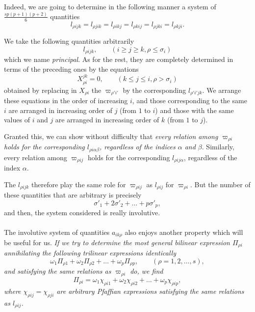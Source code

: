 \documentclass[leqno,11pt]{book}
\theoremstyle{shape1}
\theoremstyle{shapesmall}
\newcommand{\vp}{\varpi}
\begin{document}
Indeed, we are going to determine in the following manner a system of $\frac{sp(p+1)(p+2)}{6}$ quantities
\[
l_{\rho ijk}=l_{\rho jik}=l_{\rho ikj}=l_{\rho kij}=l_{\rho jki}=l_{\rho kji}.
\]

We take the following quantities arbitrarily
\[
l_{\rho ijk},\qquad(i\ge j\ge k,\rho\le \sigma_{i})
\]
which we name \emph{principal}. As for the rest, they are completely determined in terms of the preceding ones by the equations
\[
X_{\rho i}^{jk}=0,\qquad(k\le j\le i,\rho>\sigma_{i})
\]
obtained by replacing in $X_{\rho i}$ the $\vp_{\rho'i'}$ by the corresponding $l_{\rho'i'jk}$. We arrange these equations in the order of increasing $i$, and those corresponding to the same $i$ are arranged in increasing order of $j$ (from $1$ to $i$) and those with the same values of $i$ and $j$ are arranged in increasing order of $k$ (from $1$ to $j$).

Granted this, we can show without difficulty that \emph{every relation among $\vp_{\rho i}$ holds for the corresponding $l_{\rho i\alpha\beta}$, regardless of the indices $\alpha$ and $\beta$}. Similarly, every relation among $\vp_{\rho ij}$ holds for the corresponding $l_{\rho ij\alpha}$, regardless of the index $\alpha$.

The $l_{\rho ijk}$ therefore play the same role for $\vp_{\rho ij}$ as $l_{\rho ij}$ for $\vp_{\rho i}$. But the number of these quantities that are arbitrary is precisely
\[
\sigma'_{1}+2\sigma'_{2}+\dots+p\sigma'_{p},
\]
and then, the system considered is really involutive.

\paragraph{}
\label{sec:p8}
The involutive system of quantities $a_{ik\rho}$ also enjoys another property which will be useful for us. \emph{If we try to determine the most general bilinear expression $\Pi_{\rho i}$ annihilating the following trilinear expressions identically}
\begin{equation}
  \label{eq:p24}
  \omega_{1}\Pi_{\rho 1}+\omega_{2}\Pi_{\rho 2}+\dots+\omega_{p}\Pi_{\rho p},\qquad(\rho=1,2,\dots,s),
\end{equation}
\emph{and satisfying the same relations as $\vp_{\rho i}$ do, we find}
\begin{equation}
  \label{eq:p25}
  \Pi_{\rho i}=\omega_{1}\chi_{\rho i1}+\omega_{2}\chi_{\rho i2}+\dots+\omega_{p}\chi_{\rho ip},
\end{equation}
\emph{where $\chi_{\rho ij}=\chi_{\rho ji}$ are arbitrary Pfaffian expressions satisfying the same relations as $l_{\rho ij}$.}
\end{document}
